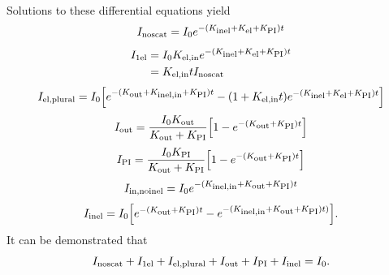 \documentclass[]{article}
\newcommand\nt{\textup{\scriptsize{0}}}
\newcommand\el{\textup{\scriptsize{el}}}
\newcommand\inel{\textup{\scriptsize{inel}}}
\newcommand\elin{\textup{\scriptsize{el,in}}}
\newcommand\inelin{\textup{\scriptsize{inel,in}}}
\newcommand\out{\textup{\scriptsize{out}}}
\newcommand\PI{\textup{\scriptsize{PI}}}
\newcommand\noscat{\textup{\scriptsize{noscat}}}
\newcommand\sel{\textup{\scriptsize{1el}}}
\newcommand\elpl{\textup{\scriptsize{el,plural}}}
\newcommand\innoinel{\textup{\scriptsize{in,noinel}}}
\begin{document}
\paragraph{} Solutions to these differential equations yield
\begin{equation}
I_{\noscat} = I_{\nt}e^{-(K_{\inel}+K_{\el}+K_{\PI})t}
\label{x1}
\end{equation} %
\begin{equation}
\begin{aligned}
I_{\sel} &= I_{\nt}K_{\elin}e^{-(K_{\inel}+K_{\el}+K_{\PI})t} \\ &= K_{\elin}tI_{\noscat}
\end{aligned}
\label{x2}
\end{equation} %
\begin{equation}
I_{\elpl} = I_{\nt} \Big[ e^{-(K_{\out}+K_{\inelin}+K_{\PI})t} - (1+K_{\elin}t)e^{-(K_{\inel}+K_{\el}+K_{\PI})t} \Big]
\label{x3}
\end{equation} %
\begin{equation}
I_{\out} = \frac{I_{\nt}K_{\out}}{K_{\out}+K_{\PI}} \Big[1 - e^{-(K_{\out}+K_{\PI})t}\Big]
\label{x4}
\end{equation} %
\begin{equation}
I_{\PI} = \frac{I_{\nt}K_{\PI}}{K_{\out}+K_{\PI}} \Big[1 - e^{-(K_{\out}+K_{\PI})t}\Big]
\label{x5}
\end{equation} %
\begin{equation}
I_{\innoinel} = I_{\nt}e^{-(K_{\inelin}+K_{\out}+K_{\PI})t}
\label{x6}
\end{equation} %
\begin{equation}
I_{\inel} = I_{\nt}\Big[e^{-(K_{\out}+K_{\PI})t} - e^{-(K_{\inelin}+K_{\out}+K_{\PI})t)}\Big].
\label{x7}
\end{equation} %
It can be demonstrated that
\begin{equation}
I_{\noscat} + I_{\sel} + I_{\elpl} + I_{\out} + I_{\PI} + I_{\inel} = I_{\nt}.
\end{equation}
\end{document}
